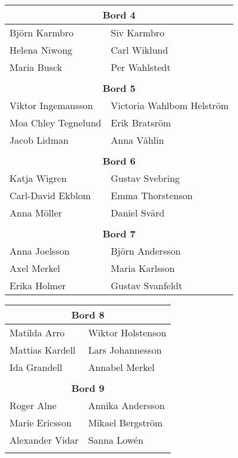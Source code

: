 \documentclass[a5paper]{article}
\begin{document}
\begin{landscape}
\begin{center}
\begin{tabular}{  l  l }
				\multicolumn{2}{c}{\textbf{Bord 4}} \\ \hline
				Björn Karmbro	&	Siv Karmbro		\\
				Helena Niwong	&	Carl Wiklund	\\ 
				Maria Busck	&	Per Wahlstedt		\\ 
				&									\\ 
				
				\multicolumn{2}{c}{\textbf{Bord 5}} 				\\ \hline
				Viktor Ingemansson	&	Victoria Wahlbom Helström	\\
				Moa Chley Tegnelund	&	Erik Bratsröm				\\ 
				Jacob Lidman	&	Anna Våhlin						\\ 
				& \\  
				
				\multicolumn{2}{c}{\textbf{Bord 6}} 		\\ \hline
				Katja Wigren	&	Gustav Svebring			\\
				Carl-David Ekblom	&	Emma Thorstenson	\\ 
				Anna Möller	&	Daniel Svärd				\\ 
				\\
				\multicolumn{2}{c}{\textbf{Bord 7}} 				\\ \hline
				Anna Joelsson	&	Björn Andersson	\\
				Axel Merkel		&	Maria Karlsson	\\ 
				Erika Holmer	&	Gustav Svanfeldt	\\ 
				
				
			\end{tabular}
			\quad \hspace*{2cm}
			\begin{tabular}{  l  l }
				\multicolumn{2}{c}{\textbf{Bord 8}} 				\\ \hline
				Matilda Arro	&	Wiktor Holstenson	\\
				Mattias Kardell	&	Lars Johannesson	\\ 
				Ida Grandell	&	Annabel Merkel	\\ 
				&										\\ 
				
				\multicolumn{2}{c}{\textbf{Bord 9}} 				\\ \hline
				Roger Alne	&	Annika Andersson	\\
				Marie Ericsson	&	Mikael Bergström	\\ 
				Alexander Vidar	&	Sanna Lowén	\\
				&										\\ 
				

\end{tabular}
\end{center}
\end{landscape}
\end{document}
